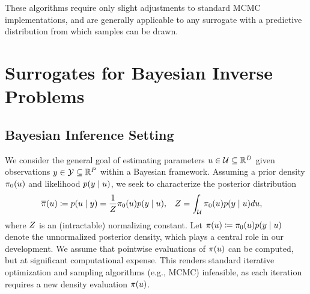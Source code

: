 \documentclass[12pt]{article}
\begin{document}
These algorithms require only
slight adjustments to standard MCMC implementations, and are generally applicable to any 
surrogate with a predictive distribution from which samples can be drawn.

\section{Surrogates for Bayesian Inverse Problems}

\subsection{Bayesian Inference Setting}
We consider the general goal of estimating parameters $u \in \mathcal{U} \subseteq \mathbb{R}^{D}$ given 
observations $y \in \mathcal{Y} \subseteq \mathbb{R}^{P}$ within a Bayesian framework.
Assuming a prior density $\pi_0(u)$ and likelihood $p(y \mid u)$, 
we seek to characterize the posterior distribution 
\begin{align}
&\overline{\pi}(u) \coloneqq p(u \mid y) = \frac{1}{Z} \pi_0(u) p(y \mid u), 
&&Z = \int_{\mathcal{U}} \pi_0(u) p(y \mid u) du, \label{post_dens_generic}
\end{align}
where $Z$ is an (intractable) normalizing constant. 
Let $\pi(u) \coloneqq \pi_0(u) p(y \mid u)$ denote the unnormalized posterior 
density, which plays a central role in our development. 
We assume that pointwise evaluations of  $\pi(u)$ can be computed, but at significant 
computational expense. This renders standard iterative optimization and sampling algorithms 
(e.g., MCMC) infeasible, as each iteration requires a new density evaluation $\pi(u)$.
\end{document}
